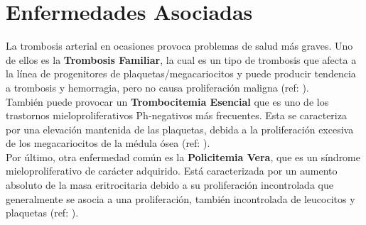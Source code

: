 \section{\textbf {Enfermedades Asociadas}}
La trombosis arterial en ocasiones provoca problemas de salud más graves. Uno de ellos es la \textbf{Trombosis Familiar}, la cual es un tipo de trombosis que afecta a la línea de progenitores de plaquetas/megacariocitos y puede producir tendencia a trombosis y hemorragia, pero no causa proliferación maligna (ref: \cite{Trombocitosis_Familiar}).\\
También puede provocar un \textbf{Trombocitemia Esencial} que  es uno de los trastornos mieloproliferativos Ph-negativos más frecuentes. Esta se caracteriza por una elevación mantenida de las plaquetas, debida a la proliferación excesiva de los megacariocitos de la médula ósea (ref: \cite{Trombocitema_Esencial}).\\
Por último, otra enfermedad común es la \textbf{Policitemia Vera}, que es un síndrome mieloproliferativo de carácter adquirido. Está caracterizada por un aumento absoluto de la masa eritrocitaria debido a su proliferación incontrolada que generalmente se asocia a una proliferación, también incontrolada de leucocitos y plaquetas (ref: \cite{Policitema_Vera}).

